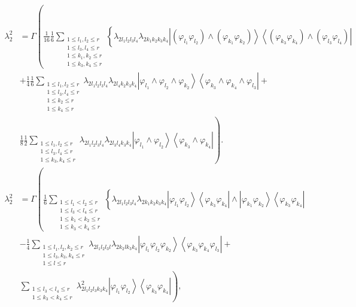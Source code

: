 \documentclass[aps,preprint]{revtex4}%
\begin{document}
\begin{align}
\lambda_{2}^{2}  &  =\Gamma\left(  \frac{1}{16}\frac{1}{6}\sum
_{\substack{1\leq l_{1},l_{2}\leq r\\1\leq l_{3},l_{4}\leq r\\1\leq
k_{1},k_{2}\leq r\\1\leq k_{3},k_{4}\leq r}}\left\{  \lambda_{2l_{1}l_{2}%
l_{3}l_{4}}\lambda_{2k_{1}k_{2}k_{3}k_{4}}\left\vert \left(  \varphi_{l_{1}%
}\varphi_{l_{2}}\right)  \wedge\left(  \varphi_{k_{1}}\varphi_{k_{2}}\right)
\right\rangle \left\langle \left(  \varphi_{k_{3}}\varphi_{k_{4}}\right)
\wedge\left(  \varphi_{l_{3}}\varphi_{l_{4}}\right)  \right\vert \right.
\right. \nonumber\\
&  +\frac{1}{4}\frac{1}{6}\sum_{\substack{1\leq l_{1},l_{2}\leq r\\1\leq
l_{3},l_{4}\leq r\\1\leq k_{2}\leq r\\1\leq k_{4}\leq r}}\lambda_{2l_{1}%
l_{2}l_{3}l_{4}}\lambda_{2l_{4}k_{2}k_{3}k_{4}}\left\vert \varphi_{l_{1}%
}\wedge\varphi_{l_{2}}\wedge\varphi_{k_{2}}\right\rangle \left\langle
\varphi_{k_{3}}\wedge\varphi_{k_{4}}\wedge\varphi_{l_{3}}\right\vert
+\nonumber\\
&  \left.  \frac{1}{8}\frac{1}{2}\sum_{\substack{1\leq l_{1},l_{2}\leq
r\\1\leq l_{3},l_{4}\leq r\\1\leq k_{3},k_{4}\leq r}}\lambda_{2l_{1}l_{2}%
l_{3}l_{4}}\lambda_{2l_{3}l_{4}k_{3}k_{4}}\left\vert \varphi_{l_{1}}%
\wedge\varphi_{l_{2}}\right\rangle \left\langle \varphi_{k_{3}}\wedge
\varphi_{k_{4}}\right\vert \right)  .
\end{align}%
\begin{align}
\lambda_{2}^{2}  &  =\Gamma\left(  \frac{1}{6}\sum_{\substack{1\leq
l_{1}<l_{2}\leq r\\1\leq l_{3}<l_{4}\leq r\\1\leq k_{1}<k_{2}\leq r\\1\leq
k_{3}<k_{4}\leq r}}\left\{  \lambda_{2l_{1}l_{2}l_{3}l_{4}}\lambda
_{2k_{1}k_{2}k_{3}k_{4}}\left\vert \varphi_{l_{1}}\varphi_{l_{2}}\right\rangle
\left\langle \varphi_{k_{3}}\varphi_{k_{4}}\right\vert \wedge\left\vert
\varphi_{k_{1}}\varphi_{k_{2}}\right\rangle \left\langle \varphi_{k_{3}%
}\varphi_{k_{4}}\right\vert \right.  \right. \nonumber\\
&  -\frac{1}{4}\sum_{\substack{1\leq l_{1},l_{2},k_{2}\leq r\\1\leq
l_{3},k_{3},k_{4}\leq r\\1\leq l\leq r}}\lambda_{2l_{1}l_{2}l_{3}l}%
\lambda_{2k_{2}lk_{3}k_{4}}\left\vert \varphi_{l_{1}}\varphi_{l_{2}}%
\varphi_{k_{2}}\right\rangle \left\langle \varphi_{k_{3}}\varphi_{k_{4}%
}\varphi_{l_{3}}\right\vert +\nonumber\\
&  \left.  \sum_{\substack{1\leq l_{3}<l_{4}\leq r\\1\leq k_{3}<k_{4}\leq
r}}\lambda_{2l_{1}l_{2}l_{3}k_{3}k_{4}}^{2}\left\vert \varphi_{l_{1}}%
\varphi_{l_{2}}\right\rangle \left\langle \varphi_{k_{3}}\varphi_{k_{4}%
}\right\vert \right)  ,
\end{align}
\end{document}
